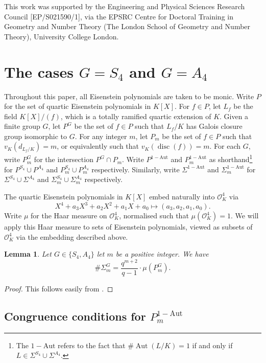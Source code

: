\documentclass[11pt]{amsart}
\theoremstyle{theorem}
\newtheorem{lemma}[theorem]{Lemma}
\theoremstyle{example}
\theoremstyle{definition}
\numberwithin{theorem}{section}
\numberwithin{theorem}{section}
\DeclareMathOperator{\Aut}{Aut}
\DeclareMathOperator{\disc}{disc}
\newcommand{\co}{\mathcal{O}}
\newcommand{\oneaut}{\mathrm{1-Aut}}
\begin{document}
This work was supported by the Engineering and Physical Sciences Research Council [EP/S021590/1], via the EPSRC Centre for Doctoral Training in Geometry and Number Theory (The London School of Geometry and Number Theory), University College London.

\section{The cases $G = S_4$ and $G = A_4$}
\label{sec-G=1}

Throughout this paper, all Eisenstein polynomials are taken to be monic. Write $P$ for the set of quartic Eisenstein polynomials in $K[X]$. For $f \in P$, let $L_f$ be the field $K[X]/(f)$, which is a totally ramified quartic extension of $K$. Given a finite group $G$, let $P^G$ be the set of $f \in P$ such that $L_f/K$ has Galois closure group isomorphic to $G$. For any integer $m$, let $P_m$ be the set of $f \in P$ such that $v_K(d_{L_f/K}) = m$, or equivalently such that $v_K(\disc(f)) = m$. For each $G$, write $P^G_m$ for the intersection $P^G \cap P_m$. Write $P^{\oneaut}$ and $P_m^{\oneaut}$ as shorthand\footnote{The $\oneaut$ refers to the fact that $\#\Aut(L/K) = 1$ if and only if $L \in \Sigma^{S_4}\cup \Sigma^{A_4}$.} for $P^{S_4}\cup P^{A_4}$ and $P_m^{S_4} \cup P_m^{A_4}$ respectively. Similarly, write $\Sigma^{\oneaut}$ and $\Sigma_m^{\oneaut}$ for $\Sigma^{S_4}\cup \Sigma^{A_4}$ and $\Sigma_m^{S_4} \cup \Sigma_m^{A_4}$ respectively.

The quartic Eisenstein polynomials in $K[X]$ embed naturally into $\co_K^4$ via 
$$
X^4 + a_3X^3 + a_2X^2 + a_1X + a_0 \mapsto (a_3,a_2,a_1,a_0).
$$
Write $\mu$ for the Haar measure on $\co_K^4$, normalised such that $\mu(\co_K^4) = 1$. We will apply this Haar measure to sets of Eisenstein polynomials, viewed as subsets of $\co_K^4$ via the embedding described above. 

\begin{lemma}
    \label{lem-num-exts-density-polys}
    Let $G \in \{S_4, A_4\}$ let $m$ be a positive integer. We have 
    $$
    \#\Sigma_m^G = \frac{q^{m+2}}{q-1}\cdot \mu(P^G_m). 
    $$
\end{lemma}
\begin{proof}
    This follows easily from \cite[Equation~13]{serre}.
\end{proof}

\subsection{Congruence conditions for $P^{\oneaut}_m$}
\end{document}
